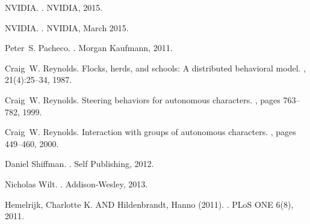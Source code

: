\documentclass[journal,transmag]{IEEEtran}
\begin{document}
\begin{thebibliography}{1}
NVIDIA.
.
\newblock NVIDIA, 2015.

NVIDIA.
.
\newblock NVIDIA, March 2015.

Peter~S. Pacheco.
.
\newblock Morgan Kaufmann, 2011.

Craig~W. Reynolds.
\newblock Flocks, herds, and schools: A distributed behavioral model.
, 21(4):25--34, 1987.

Craig~W. Reynolds.
\newblock Steering behaviors for autonomous characters.
, pages
  763--782, 1999.

Craig~W. Reynolds.
\newblock Interaction with groups of autonomous characters.
,
  pages 449--460, 2000.

Daniel Shiffman.
.
\newblock Self Publishing, 2012.

Nicholas Wilt.
.
\newblock Addison-Wesley, 2013.

Hemelrijk, Charlotte K. AND Hildenbrandt, Hanno (2011).
.
\newblock PLoS ONE 6(8), 2011.
\end{thebibliography}

%






\end{document}
